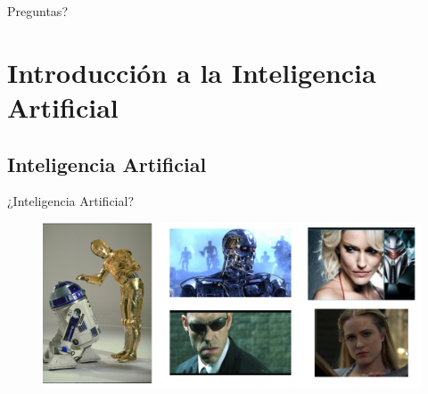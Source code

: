 \documentclass[10pt]{beamer}
\begin{document}
{
\begin{frame}[standout]
  Preguntas?
\end{frame}
}

\section{Introducción a la Inteligencia Artificial}
\subsection{Inteligencia Artificial}
\begin{frame}{¿Inteligencia Artificial?}

    \begin{figure}[!h] 
        \centering
        \includegraphics[width=1\textwidth]{img/ia1}
    \end{figure}

\end{frame}
\end{document}
